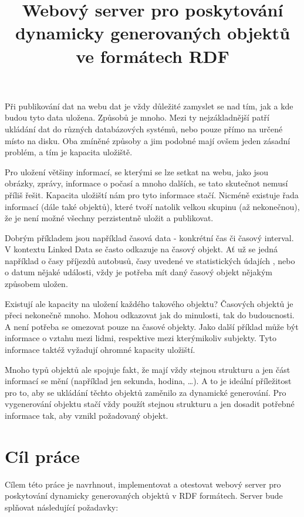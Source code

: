 \documentclass[thesis=B,czech]{FITthesis}[2012/06/26]
\title{Webový server pro poskytování dynamicky generovaných objektů ve formátech RDF}
\begin{document}

\begin{introduction}
\paragraph{}
Při publikování dat na webu dat je vždy důležité zamyslet se nad tím, jak a kde budou tyto data uložena.
Způsobů je mnoho. Mezi ty nejzákladnější patří ukládání dat do různých databázových systémů, nebo pouze přímo na určené místo na disku.
Oba zmíněné způsoby a jim podobné mají ovšem jeden zásadní problém, a tím je kapacita uložiště.

Pro uložení většiny informací, se kterými se lze setkat na webu, jako jsou obrázky, zprávy, informace o počasí a mnoho dalších, se tato skutečnot nemusí příliš řešit.
Kapacita uložiští nám pro tyto informace stačí. Nicméně existuje řada informací (dále také objektů), které tvoří natolik velkou skupinu (až nekonečnou),
že je není možné všechny perzistentně uložit a publikovat.

Dobrým příkladem jsou například časová data - konkrétní čas či časový interval. V kontextu Linked Data \cite{linked_data} se často odkazuje na časový objekt.
Ať už se jedná například o časy příjezdů autobusů, časy uvedené ve statistických údajích	,
nebo o datum nějaké události, vždy je potřeba mít daný časový objekt nějakým způsobem uložen.

Existují ale kapacity na uložení každého takového objektu? Časových objektů je přeci nekonečně mnoho. Mohou odkazovat jak do minulosti, tak do budoucnosti.
A není potřeba se omezovat pouze na časové objekty. Jako další příklad může být informace o vztahu mezi lidmi, respektive mezi kterýmikoliv subjekty.
Tyto informace taktéž vyžadují ohromné kapacity uložiští.

Mnoho typů objektů ale spojuje fakt, že mají vždy stejnou strukturu a jen část informací se mění (například jen sekunda, hodina, \ldots).
A to je ideální příležitost pro to, aby se ukládání těchto objektů zaměnilo za dynamické generování. Pro vygenerování objektu stačí vždy použít stejnou strukturu
a jen dosadit potřebné informace tak, aby vznikl požadovaný objekt.

\end{introduction}

\chapter{Cíl práce}
Cílem této práce je navrhnout, implementovat a otestovat webový server pro poskytování dynamicky generovaných objektů v RDF formátech.
Server bude splňovat následující požadavky:
\end{document}
